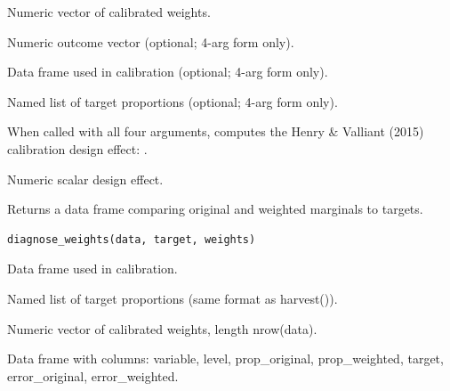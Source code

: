 \documentclass[a4paper]{book}
\begin{document}
%
\begin{Arguments}
\begin{ldescription}
\item[\code{weights}] Numeric vector of calibrated weights.

\item[\code{outcome}] Numeric outcome vector (optional; 4-arg form only).

\item[\code{data}] Data frame used in calibration (optional; 4-arg form only).

\item[\code{target}] Named list of target proportions (optional; 4-arg form only).
\end{ldescription}
\end{Arguments}
%
\begin{Details}
When called with all four arguments, computes the Henry \& Valliant (2015)
calibration design effect: .
\end{Details}
%
\begin{Value}
Numeric scalar design effect.
\end{Value}
%
\begin{Description}
Returns a data frame comparing original and weighted marginals to targets.
\end{Description}
%
\begin{Usage}
\begin{verbatim}
diagnose_weights(data, target, weights)
\end{verbatim}
\end{Usage}
%
\begin{Arguments}
\begin{ldescription}
\item[\code{data}] Data frame used in calibration.

\item[\code{target}] Named list of target proportions (same format as harvest()).

\item[\code{weights}] Numeric vector of calibrated weights, length nrow(data).
\end{ldescription}
\end{Arguments}
%
\begin{Value}
Data frame with columns: variable, level, prop\_original, prop\_weighted,
target, error\_original, error\_weighted.
\end{Value}
\end{document}
